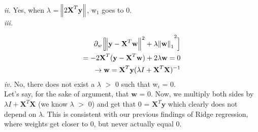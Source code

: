 \documentclass[12 pt]{article}
\begin{document}
	\noindent\textit{ii.} Yes, when $\lambda$ =  $\norm{2 \textbf{X}^T\textbf{y}}$, w$_1$ goes to 0. \\
	
	\noindent\textit{iii.}
	
	\begin{eqnarray*}
	\partial_w \Big[ \space{\norm{\textbf{y} - \textbf{X}^{T}\textbf{w}}^2 + \lambda\norm{\textbf{w}}_1}^2\Big] \\
	= -2\textbf{X}^T (\textbf{y} - \textbf{X}^{T}\textbf{w}) + 2\lambda\textbf{w} = 0 \\
	\rightarrow \textbf{w} = \textbf{X}^T\textbf{y}(\lambda I + \textbf{X}^T\textbf{X})^{-1}
	\end{eqnarray*} 
	\noindent\textit{iv.} No, there does not exist a $\lambda$ $>$ 0 such that w$_i$ = 0. \\
	
	\noindent Let's say, for the sake of argument, that $\textbf{w}$ = 0. Now, we multiply both sides by $\lambda I + \textbf{X}^T\textbf{X}$ (we know $\lambda$ $>$ 0) and get that 0 = $\textbf{X}^T\textbf{y}$ which clearly does not depend on $\lambda$. 
	This is consistent with our previous findings of Ridge regression, where weights get closer to 0, but never actually equal 0.\\
\end{document}
